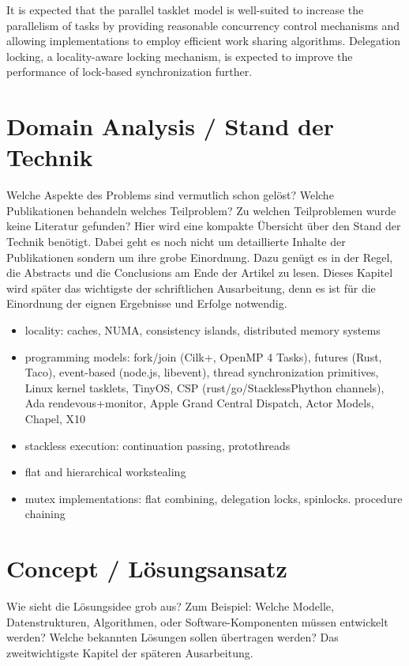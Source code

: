 \documentclass[journal]{IEEEtran}
\begin{document}
It is expected that the parallel tasklet model is well-suited to
increase the parallelism of tasks by providing reasonable concurrency
control mechanisms and allowing implementations to employ efficient
work sharing algorithms. Delegation locking, a locality-aware locking
mechanism, is expected to improve the performance of lock-based
synchronization further.


\section{Domain Analysis / Stand der Technik}
\begin{itshape}
  Welche Aspekte des Problems sind vermutlich schon gelöst? Welche
  Publikationen behandeln welches Teilproblem? Zu welchen
  Teilproblemen wurde keine Literatur gefunden?  Hier wird eine
  kompakte Übersicht über den Stand der Technik benötigt. Dabei geht
  es noch nicht um detaillierte Inhalte der Publikationen sondern um
  ihre grobe Einordnung. Dazu genügt es in der Regel, die Abstracts
  und die Conclusions am Ende der Artikel zu lesen. Dieses Kapitel
  wird später das wichtigste der schriftlichen Ausarbeitung, denn es
  ist für die Einordnung der eignen Ergebnisse und Erfolge notwendig.
\end{itshape}

\begin{itemize}
\item locality: caches, NUMA, consistency islands, distributed memory systems
\item programming models: fork/join (Cilk+, OpenMP 4 Tasks), futures
  (Rust, Taco), event-based (node.js, libevent), thread
  synchronization primitives, Linux kernel tasklets, TinyOS, CSP
  (rust/go/StacklessPhython channels), Ada rendevous+monitor, Apple
  Grand Central Dispatch, Actor Models, Chapel, X10
\item stackless execution: continuation passing, protothreads
\item flat and hierarchical workstealing
\item mutex implementations: flat combining, delegation locks, spinlocks. procedure chaining
\end{itemize}


\section{Concept / Lösungsansatz}
\begin{itshape}
  Wie sieht die Lösungsidee grob aus? Zum Beispiel: Welche Modelle,
  Datenstrukturen, Algorithmen, oder Software-Komponenten müssen
  entwickelt werden? Welche bekannten Lösungen sollen übertragen
  werden? Das zweitwichtigste Kapitel der späteren Ausarbeitung.
\end{itshape}
\end{document}
